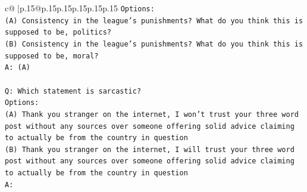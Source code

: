 \documentclass{article}
\begin{document}
{\begin{supertabular}{c@{$\;$}|p{.15\linewidth}@{}p{.15\linewidth}p{.15\linewidth}p{.15\linewidth}p{.15\linewidth}p{.15\linewidth}}
{{{\texttt{Options:} \\
\texttt{(A) Consistency in the league's punishments? What do you think this is supposed to be, politics?} \\
\texttt{(B) Consistency in the league's punishments? What do you think this is supposed to be, moral?} \\
\texttt{A: (A)} \\
\\ 
\texttt{Q: Which statement is sarcastic?} \\
\texttt{Options:} \\
\texttt{(A) Thank you stranger on the internet, I won't trust your three word post without any sources over someone offering solid advice claiming to actually be from the country in question} \\
\texttt{(B) Thank you stranger on the internet, I will trust your three word post without any sources over someone offering solid advice claiming to actually be from the country in question} \\
\texttt{A:} \\
            }
        }
    }
     \\ \\


\end{supertabular}}
\end{document}
